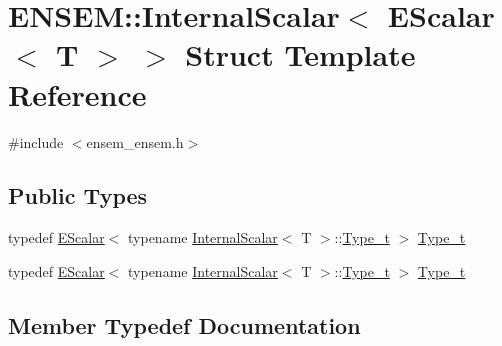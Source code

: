 \hypertarget{structENSEM_1_1InternalScalar_3_01EScalar_3_01T_01_4_01_4}{}\section{E\+N\+S\+EM\+:\+:Internal\+Scalar$<$ E\+Scalar$<$ T $>$ $>$ Struct Template Reference}
\label{structENSEM_1_1InternalScalar_3_01EScalar_3_01T_01_4_01_4}


{\ttfamily \#include $<$ensem\+\_\+ensem.\+h$>$}

\subsection*{Public Types}
\begin{DoxyCompactItemize}
\item 
typedef \mbox{\hyperlink{classENSEM_1_1EScalar}{E\+Scalar}}$<$ typename \mbox{\hyperlink{structENSEM_1_1InternalScalar}{Internal\+Scalar}}$<$ T $>$\+::\mbox{\hyperlink{structENSEM_1_1InternalScalar_3_01EScalar_3_01T_01_4_01_4_a2f304cf7e12b0c7a448c8094b39fd90d}{Type\+\_\+t}} $>$ \mbox{\hyperlink{structENSEM_1_1InternalScalar_3_01EScalar_3_01T_01_4_01_4_a2f304cf7e12b0c7a448c8094b39fd90d}{Type\+\_\+t}}
\item 
typedef \mbox{\hyperlink{classENSEM_1_1EScalar}{E\+Scalar}}$<$ typename \mbox{\hyperlink{structENSEM_1_1InternalScalar}{Internal\+Scalar}}$<$ T $>$\+::\mbox{\hyperlink{structENSEM_1_1InternalScalar_3_01EScalar_3_01T_01_4_01_4_a2f304cf7e12b0c7a448c8094b39fd90d}{Type\+\_\+t}} $>$ \mbox{\hyperlink{structENSEM_1_1InternalScalar_3_01EScalar_3_01T_01_4_01_4_a2f304cf7e12b0c7a448c8094b39fd90d}{Type\+\_\+t}}
\end{DoxyCompactItemize}


\subsection{Member Typedef Documentation}
\mbox{\label{structENSEM_1_1InternalScalar_3_01EScalar_3_01T_01_4_01_4_a2f304cf7e12b0c7a448c8094b39fd90d}} 
